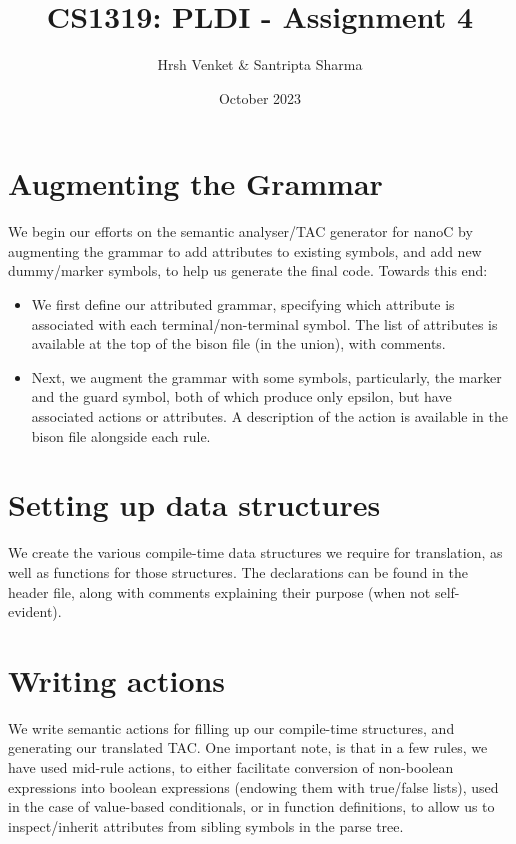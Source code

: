 \documentclass{article}
\title{CS1319: PLDI - Assignment 4}
\author{Hrsh Venket \& Santripta Sharma}
\date{October 2023}
\begin{document}
\maketitle 

\section{Augmenting the Grammar}
We begin our efforts on the semantic analyser/TAC generator for nanoC by augmenting the grammar to add attributes to existing symbols, and add new dummy/marker symbols, to help us generate the final code. Towards this end:

\begin{itemize}
	\item We first define our attributed grammar, specifying which attribute is associated with each terminal/non-terminal symbol. The list of attributes is available at the top of the bison file (in the union), with comments.
	\item Next, we augment the grammar with some symbols, particularly, the marker and the guard symbol, both of which produce only epsilon, but have associated actions or attributes. A description of the action is available in the bison file alongside each rule.
\end{itemize}

\section{Setting up data structures}
We create the various compile-time data structures we require for translation, as well as functions for those structures. The declarations can be found in the header file, along with comments explaining their purpose (when not self-evident).

\section{Writing actions}
We write semantic actions for filling up our compile-time structures, and generating our translated TAC. One important note, is that in a few rules, we have used mid-rule actions, to either facilitate conversion of non-boolean expressions into boolean expressions (endowing them with true/false lists), used in the case of value-based conditionals, or in function definitions, to allow us to inspect/inherit attributes from sibling symbols in the parse tree.
\end{document}
